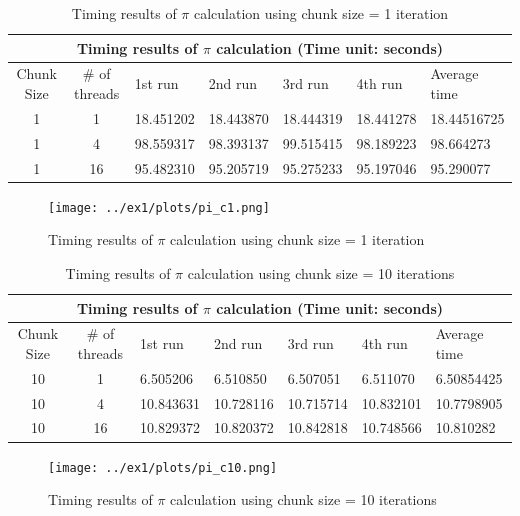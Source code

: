 \documentclass{article}
\begin{document}
\begin{table}[htbp]
  \centering
    \begin{tabular}{|c c||l l l l| l|} 
    \hline
    \multicolumn{7}{|c|}{Timing results of $\pi$ calculation (Time unit: seconds)} \\
    \hline
    Chunk Size & \# of threads & 1st run & 2nd run & 3rd run & 4th run & Average time\\ [0.5ex] 
    \hline\hline
    1 & 1 & 18.451202 & 18.443870 & 18.444319 & 18.441278 & 18.44516725 \\ 
    \hline
    1 & 4 & 98.559317 & 98.393137 & 99.515415 & 98.189223 & 98.664273 \\
    \hline
    1 & 16 & 95.482310 & 95.205719 & 95.275233 & 95.197046 & 95.290077 \\ [1ex]
    \hline
    \end{tabular}
  \caption{Timing results of $\pi$ calculation using chunk size = 1 iteration}
\end{table}


\begin{figure}[htbp]
  \centering
  \texttt{[image: ../ex1/plots/pi\_c1.png]}
  \caption{Timing results of $\pi$ calculation using chunk size = 1 iteration}
\end{figure}


\begin{table}[htbp]
  \centering
    \begin{tabular}{|c c||l l l l| l|} 
    \hline
    \multicolumn{7}{|c|}{Timing results of $\pi$ calculation (Time unit: seconds)} \\
    \hline
    Chunk Size & \# of threads & 1st run & 2nd run & 3rd run & 4th run & Average time\\ [0.5ex] 
    \hline\hline
    10 & 1 & 6.505206 & 6.510850 & 6.507051 & 6.511070 & 6.50854425 \\
    \hline
    10 & 4 & 10.843631 & 10.728116 & 10.715714 & 10.832101 & 10.7798905 \\
    \hline
    10 & 16 & 10.829372 & 10.820372 & 10.842818 & 10.748566 & 10.810282 \\ [1ex]
    \hline
    \end{tabular}
  \caption{Timing results of $\pi$ calculation using chunk size = 10 iterations}
\end{table}

\begin{figure}[htbp]
  \centering
  \texttt{[image: ../ex1/plots/pi\_c10.png]}
  \caption{Timing results of $\pi$ calculation using chunk size = 10 iterations}
\end{figure}
\end{document}
